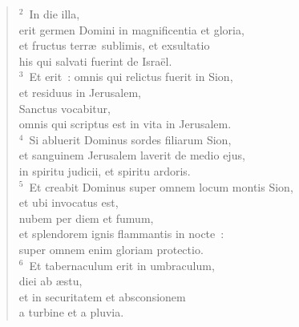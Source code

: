 \begin{flushleft}\begin{verse}\vspace{6pt}${}^{2}$~In die illa,\\ erit germen Domini in magnificentia et gloria,\\ et fructus terr\ae\ sublimis, et exsultatio\\ his qui salvati fuerint de Isra\"el.\\
${}^{3}$~Et erit~: omnis qui relictus fuerit in Sion,\\ et residuus in Jerusalem,\\ Sanctus vocabitur,\\ omnis qui scriptus est in vita in Jerusalem.\\
${}^{4}$~Si abluerit Dominus sordes filiarum Sion,\\ et sanguinem Jerusalem laverit de medio ejus,\\ in spiritu judicii, et spiritu ardoris.\\
${}^{5}$~Et creabit Dominus super omnem locum montis Sion,\\ et ubi invocatus est,\\ nubem per diem et fumum,\\ et splendorem ignis flammantis in nocte~:\\ super omnem enim gloriam protectio.\\
${}^{6}$~Et tabernaculum erit in umbraculum,\\ diei ab \ae stu,\\ et in securitatem et absconsionem\\ a turbine et a pluvia.\end{verse}\end{flushleft}


